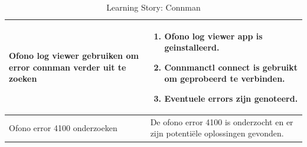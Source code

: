 \documentclass[a4paper]{report}
\begin{document}
\begin{tcolorbox}
\begin{table}[H]
\begin{tabularx}{1\textwidth}{|X|X|}
      \hline
      Ofono log viewer gebruiken om error connman verder uit te zoeken & 
      \begin{enumerate}
        \item Ofono log viewer app is geinstalleerd.
        \item Connmanctl connect is gebruikt om geprobeerd te verbinden.
        \item Eventuele errors zijn genoteerd.
      \end{enumerate} \\
      \hline
      Ofono error 4100 onderzoeken & De ofono error 4100 is onderzocht en er zijn potentiële oplossingen gevonden. \\
      \hline
    \end{tabularx}
    \caption{Learning Story: Connman}
  \label{table:it4:story_connman}
  \end{table}
  \end{tcolorbox}
\end{document}
